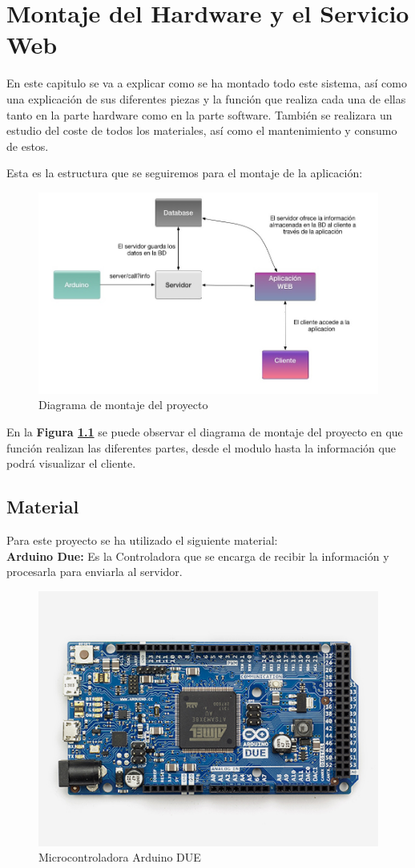 
\chapter{Montaje del Hardware y el Servicio Web}

\setlength{\parindent}{5ex}En este capitulo se va a explicar como se ha montado todo este sistema, así como una explicación de sus diferentes piezas y la función que realiza cada una de ellas tanto en la parte hardware como en la parte software.
También se realizara un estudio del coste de todos los materiales, así como el mantenimiento y consumo de estos.

\setlength{\parindent}{0ex}Esta es la estructura que se seguiremos para el montaje de la aplicación:

\begin{figure}[!h]
	\centering
	\includegraphics[width=0.9\linewidth]{figuras/montage1}
	\caption{Diagrama de montaje del proyecto}
	\label{fig:imgmontage1}
\end{figure}

En la \textbf{Figura \ref{fig:imgmontage1}} se puede observar el diagrama de montaje del proyecto en que función realizan las diferentes partes, desde el modulo hasta la información que podrá visualizar el cliente.

\section{Material}

\setlength{\parindent}{0ex}Para este proyecto se ha utilizado el siguiente material:\\

\textbf{Arduino Due:} Es la Controladora que se encarga de recibir la información y procesarla para enviarla al servidor.

\begin{figure}[!h]
	\centering
	\includegraphics[width=0.4\linewidth]{figuras/arddue}
	\caption{Microcontroladora Arduino DUE}
	\label{fig:imgdue}
\end{figure}

